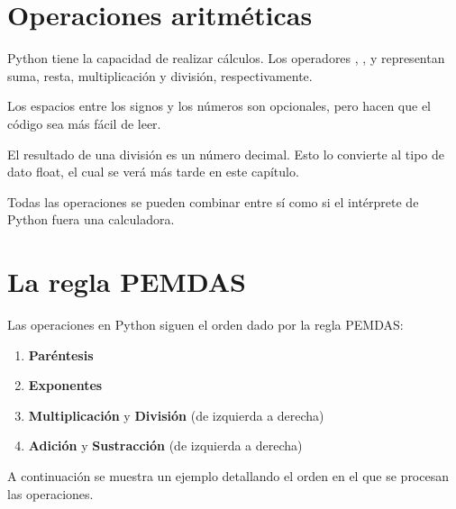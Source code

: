 
\section{Operaciones aritméticas}

Python tiene la capacidad de realizar cálculos. Los operadores \ttt{+}, \ttt{-}, \ttt{*} y \ttt{/} representan suma, resta, multiplicación y división, respectivamente.


Los espacios entre los signos y los números son opcionales, pero hacen que el código sea más fácil de leer.\smallskip

El resultado de una división es un número decimal. Esto lo convierte al tipo de dato float, el cual se verá más tarde en este capítulo.


Todas las operaciones se pueden combinar entre sí como si el intérprete de Python fuera una calculadora.


\section{La regla PEMDAS}

Las operaciones en Python siguen el orden dado por la regla PEMDAS:

\begin{enumerate}
  \item \textbf{Paréntesis} \ttt{()}
  
  \item \textbf{Exponentes} \ttt{**}
  
  \item \textbf{Multiplicación} \ttt{*} y \textbf{División} \ttt{/} (de izquierda a derecha)
  
  \item \textbf{Adición} \ttt{+} y \textbf{Sustracción} \ttt{-} (de izquierda a derecha)
  
\end{enumerate}

A continuación se muestra un ejemplo detallando el orden en el que se procesan las operaciones.

